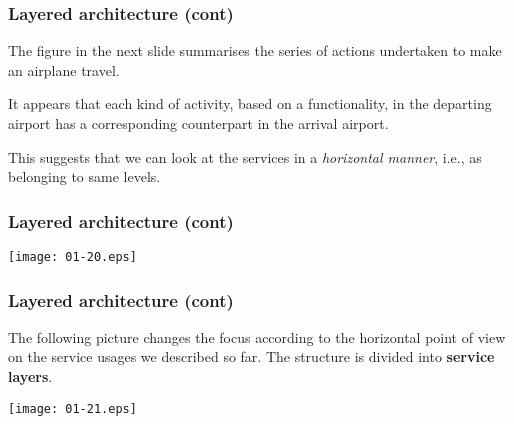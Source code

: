 %
\begin{frame}
\frametitle{Layered architecture (cont)}

The figure in the next slide summarises the series of actions
undertaken to make an airplane travel. 

\bigskip

It appears that each kind of activity, based on a functionality, in
the departing airport has a corresponding counterpart in the arrival
airport.

\bigskip

This suggests that we can look at the services in a \emph{horizontal
manner}, i.e., as belonging to same levels.

\end{frame}

%
\begin{frame}
\frametitle{Layered architecture (cont)}

\begin{center}
  \texttt{[image: 01-20.eps]}
\end{center}

\end{frame}

%
\begin{frame}
\frametitle{Layered architecture (cont)}

The following picture changes the focus according to the horizontal
point of view on the service usages we described so far. The structure
is divided into \textbf{service layers}.

\begin{center}
\texttt{[image: 01-21.eps]}
\end{center}

\end{frame}

